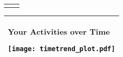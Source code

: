 \documentclass[
  a4paper]{article}
\begin{document}
\begin{table}[H]
\begin{center}
\begin{tabular}{m{12cm} m{6cm}}
      \vspace{0.1mm} \\
      \hline
      \vspace{0.1mm}
    \end{tabular}
      \begin{tabular}{m{19cm}}
        \begin{center}
        \large{\textbf{Your Activities over Time}}
      \end{center}
      \begin {minipage} {19cm}
        \begin{center}
          \texttt{[image: timetrend\_plot.pdf]}
        \end{center}
      \end{minipage} \\
      \hline
    \end{tabular}
  \end{center}
\end{table}
\end{document}
